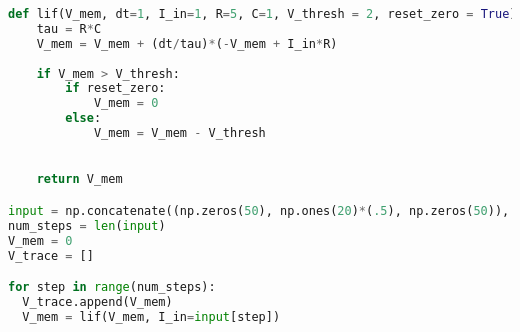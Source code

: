 \begin{lstlisting}[language=Python, caption={Python implementation of the action potential full simulation of a LIF: $I_{in}=1$, $V_{thresh} = 2$ is threshold}, label={lst:membranepotentialfull}]
def lif(V_mem, dt=1, I_in=1, R=5, C=1, V_thresh = 2, reset_zero = True):
	tau = R*C
	V_mem = V_mem + (dt/tau)*(-V_mem + I_in*R)
 
	if V_mem > V_thresh:
		if reset_zero:
			V_mem = 0
		else:
			V_mem = V_mem - V_thresh

 
	return V_mem

input = np.concatenate((np.zeros(50), np.ones(20)*(.5), np.zeros(50)), 0)
num_steps = len(input)
V_mem = 0
V_trace = []

for step in range(num_steps):
  V_trace.append(V_mem)
  V_mem = lif(V_mem, I_in=input[step])
\end{lstlisting}
